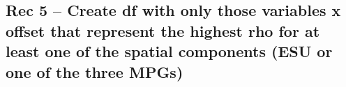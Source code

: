 \documentclass[]{article}
\newenvironment{Shaded}{\begin{snugshade}}{\end{snugshade}}
\newcommand{\KeywordTok}[1]{\textcolor[rgb]{0.13,0.29,0.53}{\textbf{{#1}}}}
\newcommand{\DecValTok}[1]{\textcolor[rgb]{0.00,0.00,0.81}{{#1}}}
\newcommand{\StringTok}[1]{\textcolor[rgb]{0.31,0.60,0.02}{{#1}}}
\newcommand{\CommentTok}[1]{\textcolor[rgb]{0.56,0.35,0.01}{\textit{{#1}}}}
\newcommand{\NormalTok}[1]{{#1}}
\begin{document}
\begin{Shaded}
\end{Shaded}

\subsection{Rec 5 -- Create df with only those variables x offset that
represent the highest rho for at least one of the spatial components
(ESU or one of the three
MPGs)}\label{rec-5-create-df-with-only-those-variables-x-offset-that-represent-the-highest-rho-for-at-least-one-of-the-spatial-components-esu-or-one-of-the-three-mpgs-1}
\end{document}
